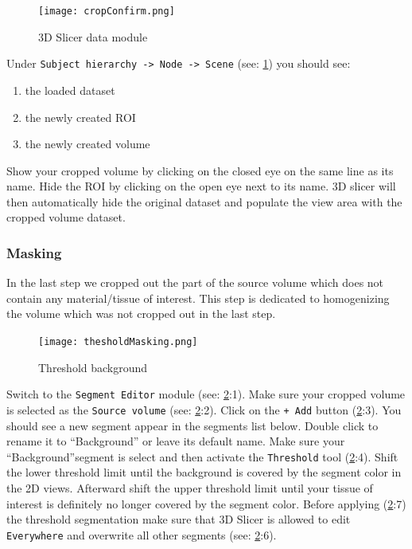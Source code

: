\begin{figure}[h!]
	\centerline{
		\texttt{[image: cropConfirm.png]}}
	\caption{3D Slicer data module}\label{fig:cC}
\end{figure}
\pagebreak
\newline
Under \texttt{Subject hierarchy -> Node -> Scene} (see: \cref{fig:cC}) you should see:
\begin{enumerate}
	\item the loaded dataset
	\item the newly created ROI
	\item the newly created volume
\end{enumerate}
Show your cropped volume by clicking on the closed eye on the same line as its name. Hide the ROI by clicking on the open eye next to its name.
3D slicer will then automatically hide the original dataset and populate the view area with the cropped volume dataset.

\subsubsection{Masking}\label{mask}
In the last step we cropped out the part of the source volume which does not contain any material/tissue of interest.
This step is dedicated to homogenizing the volume which was not cropped out in the last step.
\begin{figure}[h!]
	\centerline{
		\texttt{[image: thesholdMasking.png]}}
	\caption{Threshold background}\label{fig:tM}
\end{figure}
Switch to the \texttt{Segment Editor} module (see: \cref{fig:tM}:1).
Make sure your cropped volume is selected as the \texttt{Source volume} (see: \cref{fig:tM}:2).
Click on the \texttt{+ Add} button (\cref{fig:tM}:3). You should see a new segment appear in the segments list below.
Double click to rename it to ``Background'' or leave its default name.
Make sure your ``Background''segment is select and then activate the \texttt{Threshold} tool (\cref{fig:tM}:4).
Shift the lower threshold limit until the background is covered by the segment color in the 2D views. Afterward shift the upper threshold limit until your tissue of interest is definitely no longer covered by the segment color.
Before applying (\cref{fig:tM}:7) the threshold segmentation make sure that 3D Slicer is allowed to edit \texttt{Everywhere} and overwrite all other segments (see: \cref{fig:tM}:6).

